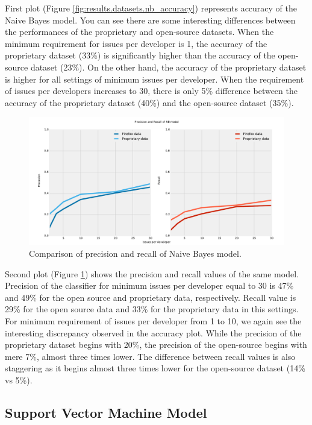 First plot (Figure \ref{fig:results.datasets.nb_accuracy}) represents accuracy of the Naive Bayes model. You can see there are some interesting differences between the performances of the proprietary and open-source datasets. When the minimum requirement for issues per developer is 1, the accuracy of the proprietary dataset (33\%) is significantly higher than the accuracy of the open-source dataset (23\%). On the other hand, the accuracy of the proprietary dataset is higher for all settings of minimum issues per developer. When the requirement of issues per developers increases to 30, there is only 5\% difference between the accuracy of the proprietary dataset (40\%) and the open-source dataset (35\%).

\begin{figure}[htbp]
    \centering
        \includegraphics[width=\textwidth]{./images/prop_vs_os/nb_precision_and_recall.pdf}
    \caption{Comparison of precision and recall of Naive Bayes model.}
    \label{fig:results.datasets.nb_pr}
\end{figure}

Second plot (Figure \ref{fig:results.datasets.nb_pr}) shows the precision and recall values of the same model. Precision of the classifier for minimum issues per developer equal to 30 is 47\% and 49\% for the open source and proprietary data, respectively. Recall value is 29\% for the open source data and 33\% for the proprietary data in this settings. For minimum requirement of issues per developer from 1 to 10, we again see the interesting discrepancy observed in the accuracy plot. While the precision of the proprietary dataset begins with 20\%, the precision of the open-source begins with mere 7\%, almost three times lower. The difference between recall values is also staggering as it begins almost three times lower for the open-source dataset (14\% vs 5\%).

\subsection{Support Vector Machine Model}

